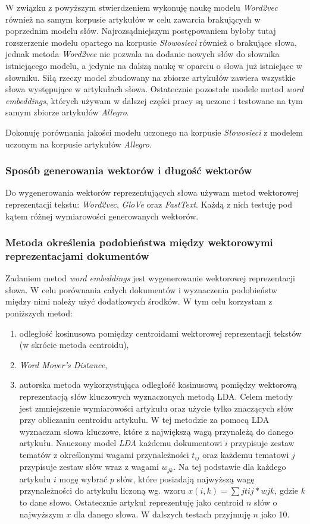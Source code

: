 \documentclass[pl]{minipw} %
\begin{document}
W związku z powyższym stwierdzeniem wykonuję naukę modelu \textit{Word2vec} również na samym korpusie artykułów w celu zawarcia brakujących w poprzednim modelu słów. Najrozsądniejszym postępowaniem byłoby tutaj rozszerzenie modelu opartego na korpusie \textit{Słowosieci} również o brakujące słowa, jednak metoda \textit{Word2vec} nie pozwala na dodanie nowych słów do słownika istniejącego modelu, a jedynie na dalszą naukę w oparciu o słowa już istniejące w słowniku. Siłą rzeczy model zbudowany na zbiorze artykułów zawiera wszystkie słowa występujące w artykułach słowa. Ostatecznie pozostałe modele metod \textit{word embeddings}, których używam w dalszej części pracy są uczone i testowane na tym samym zbiorze artykułów \textit{Allegro}.

Dokonuję porównania jakości modelu uczonego na korpusie \textit{Słowosieci} z modelem uczonym na korpusie artykułów \textit{Allegro}.

\subsubsection{Sposób generowania wektorów i długość wektorów}
Do wygenerowania wektorów reprezentujących słowa używam metod wektorowej reprezentacji tekstu: \textit{Word2vec}, \textit{GloVe} oraz \textit{FastText}. Każdą z nich testuję pod kątem różnej wymiarowości generowanych wektorów.

\subsubsection{Metoda określenia podobieństwa między wektorowymi reprezentacjami dokumentów}
Zadaniem metod \textit{word embeddings} jest wygenerowanie wektorowej reprezentacji słowa. W celu porównania całych dokumentów i wyznaczenia podobieństw między nimi należy użyć dodatkowych środków. W tym celu korzystam z poniższych metod:
\begin{enumerate}
	\item odległość kosinusowa pomiędzy centroidami wektorowej reprezentacji tekstów (w skrócie metoda centroidu),
	\item \textit{Word Mover's Distance},
	\item autorska metoda wykorzystująca odległość kosinusową pomiędzy wektorową reprezentacją słów kluczowych wyznaczonych metodą LDA. Celem metody jest zmniejszenie wymiarowości artykułu oraz użycie tylko znaczących słów przy obliczaniu centroidu artykułu. W tej metodzie za pomocą LDA wyznaczam słowa kluczowe, które z największą wagą przynależą do danego artykułu. Nauczony model \textit{LDA} każdemu dokumentowi $i$ przypisuje zestaw tematów z określonymi wagami przynależności $t_{ij}$ oraz każdemu tematowi $j$ przypisuje zestaw słów wraz z wagami $w_{jk}$. Na tej podstawie dla każdego artykułu $i$ mogę wybrać $p$ słów, które posiadają najwyższą wagę przynależności do artykułu liczoną wg. wzoru $x(i,k)=\sum{j}t{ij}*w{jk}$, gdzie $k$ to dane słowo. Ostatecznie artykuł reprezentuję jako centroid $n$ słów o najwyższym $x$ dla danego słowa. W dalszych testach przyjmuję $n$ jako 10.
\end{enumerate}
\end{document}
